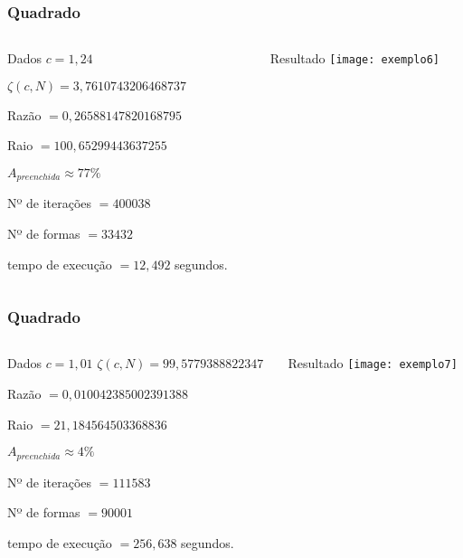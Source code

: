 \documentclass[aspectratio=169,11pt,red]{beamer}
\begin{document}
\begin{frame}
\frametitle{Quadrado}
\begin{columns}[T]
\begin{column}{.5\textwidth}
\begin{block}{\centering Dados}
$c=1,24$
\smallskip

$\zeta(c,N)=3,7610743206468737$
\smallskip

Razão $=0,26588147820168795$
\smallskip

Raio $=100,65299443637255$
\smallskip

$A_{preenchida} \approx 77\%$
\smallskip

Nº de iterações $=400038$
\smallskip

Nº de formas $=33432$
\smallskip

tempo de execução $= 12,492$ segundos.
\smallskip
\end{block}
\end{column}

\begin{column}{.5\textwidth}
\begin{block}{\centering Resultado}
\centering
\texttt{[image: exemplo6]}
\end{block}
\end{column}
\end{columns}
\end{frame}

\begin{frame}
\frametitle{Quadrado}
\begin{columns}[T]
\begin{column}{.5\textwidth}
\begin{block}{\centering Dados}
$c=1,01$
\smallskip
$\zeta(c,N)=99,5779388822347$
\smallskip

Razão $=0,010042385002391388$
\smallskip

Raio $=21,184564503368836$
\smallskip

$A_{preenchida} \approx 4\%$
\smallskip

Nº de iterações $=111583$
\smallskip

Nº de formas $=90001$
\smallskip

tempo de execução $=256,638$ segundos.
\smallskip
\end{block}
\end{column}

\begin{column}{.5\textwidth}
\begin{block}{\centering Resultado}
\centering
\texttt{[image: exemplo7]}
\end{block}
\end{column}
\end{columns}
\end{frame}
\end{document}
